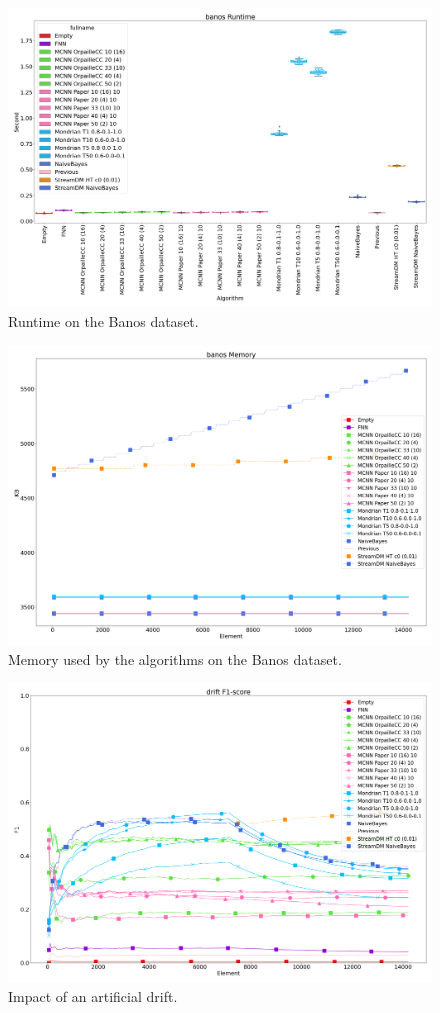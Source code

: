 \begin{figure}[H]
	\includegraphics[width=\linewidth]{figures/results/banos_runtime.png}
	\caption{Runtime on the Banos dataset.}
\end{figure}
\begin{figure}[H]
	\includegraphics[width=\linewidth]{figures/results/banos_memory.png}
	\caption{Memory used by the algorithms on the Banos dataset.}
\end{figure}
\begin{figure}[H]
	\includegraphics[width=\linewidth]{figures/results/drift_f1.png}
	\caption{Impact of an artificial drift.}
\end{figure}

